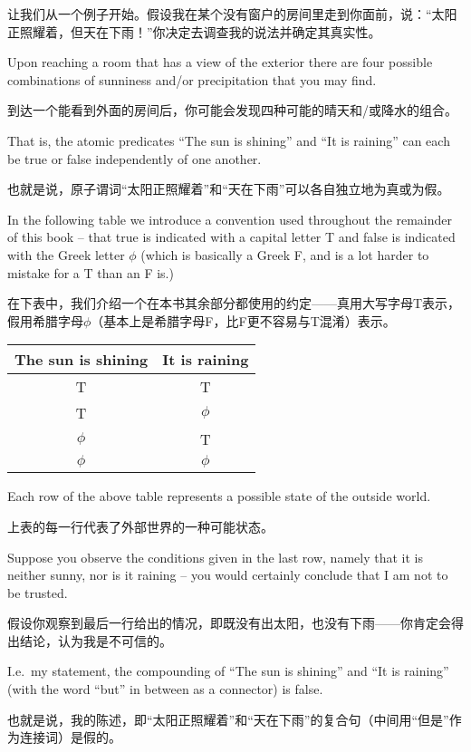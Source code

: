 让我们从一个例子开始。假设我在某个没有窗户的房间里走到你面前，说：“太阳正照耀着，但天在下雨！”你决定去调查我的说法并确定其真实性。

Upon
reaching a room that has a view of the exterior there are four possible
combinations of sunniness and/or precipitation that you may find.

到达一个能看到外面的房间后，你可能会发现四种可能的晴天和/或降水的组合。

That is,
the atomic predicates ``The sun is shining'' and ``It is raining'' can each 
be true or false independently of one another.

也就是说，原子谓词“太阳正照耀着”和“天在下雨”可以各自独立地为真或为假。

In the following table 
we introduce a convention used throughout the remainder of this book -- 
that true is indicated with a capital letter T and false is indicated 
with the Greek letter $\phi$ (which is basically a Greek F, and is a lot harder
to mistake for a T than an F is.)

在下表中，我们介绍一个在本书其余部分都使用的约定——真用大写字母T表示，假用希腊字母$\phi$（基本上是希腊字母F，比F更不容易与T混淆）表示。

\begin{center}
\begin{tabular}{c|c}
The sun is shining \; & \; It is raining \\ \hline
T & T \\
T & $\phi$ \\
 $\phi$ & T \\
 $\phi$ &  $\phi$ \\
\end{tabular}
\end{center}

Each row of the above table represents a possible state of the outside 
world.

上表的每一行代表了外部世界的一种可能状态。

Suppose you observe the conditions given in the last row, namely
that it is neither sunny, nor is it raining -- you would certainly conclude
that I am not to be trusted.

假设你观察到最后一行给出的情况，即既没有出太阳，也没有下雨——你肯定会得出结论，认为我是不可信的。

I.e.\ my statement, the compounding of 
``The sun is shining'' and ``It is raining'' (with the word ``but'' in between
as a connector) is false.

也就是说，我的陈述，即“太阳正照耀着”和“天在下雨”的复合句（中间用“但是”作为连接词）是假的。

